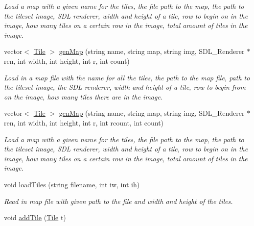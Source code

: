 \begin{DoxyCompactItemize}
\begin{DoxyCompactList}\small\item\em Load a map with a given name for the tiles, the file path to the map, the path to the tileset image, S\+DL renderer, width and height of a tile, row to begin on in the image, how many tiles on a certain row in the image, total amount of tiles in the image. \end{DoxyCompactList}\item 
vector$<$ \hyperlink{classTile}{Tile} $>$ \hyperlink{classTileset_a6ab8298e8749b87eb7581510fb659f53}{gen\+Map} (string name, string map, string img, S\+D\+L\+\_\+\+Renderer $\ast$ren, int width, int height, int r, int count)\hypertarget{classTileset_a6ab8298e8749b87eb7581510fb659f53}{}\label{classTileset_a6ab8298e8749b87eb7581510fb659f53}

\begin{DoxyCompactList}\small\item\em Load in a map file with the name for all the tiles, the path to the map file, path to the tileset image, the S\+DL renderer, width and height of a tile, row to begin from on the image, how many tiles there are in the image. \end{DoxyCompactList}\item 
vector$<$ \hyperlink{classTile}{Tile} $>$ \hyperlink{classTileset_abafacb40bbcddc60e39f031fac531b02}{gen\+Map} (string name, string map, string img, S\+D\+L\+\_\+\+Renderer $\ast$ren, int width, int height, int r, int rcount, int count)\hypertarget{classTileset_abafacb40bbcddc60e39f031fac531b02}{}\label{classTileset_abafacb40bbcddc60e39f031fac531b02}

\begin{DoxyCompactList}\small\item\em Load a map with a given name for the tiles, the file path to the map, the path to the tileset image, S\+DL renderer, width and height of a tile, row to begin on in the image, how many tiles on a certain row in the image, total amount of tiles in the image. \end{DoxyCompactList}\item 
void \hyperlink{classTileset_a5359de30fef35821e69a2b13300e8cba}{load\+Tiles} (string filename, int iw, int ih)\hypertarget{classTileset_a5359de30fef35821e69a2b13300e8cba}{}\label{classTileset_a5359de30fef35821e69a2b13300e8cba}

\begin{DoxyCompactList}\small\item\em Read in map file with given path to the file and width and height of the tiles. \end{DoxyCompactList}\item 
void \hyperlink{classTileset_a26acaabd06601aba2e277fdd2b750fc7}{add\+Tile} (\hyperlink{classTile}{Tile} t)\hypertarget{classTileset_a26acaabd06601aba2e277fdd2b750fc7}{}\label{classTileset_a26acaabd06601aba2e277fdd2b750fc7}


\end{DoxyCompactItemize}
